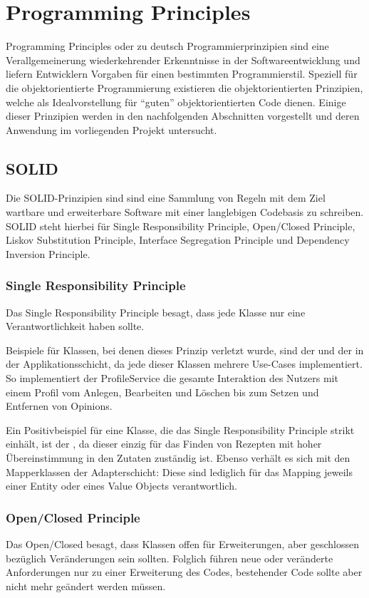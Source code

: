 \chapter{Programming Principles}
Programming Principles oder zu deutsch Programmierprinzipien sind eine Verallgemeinerung wiederkehrender Erkenntnisse in der Softwareentwicklung und liefern Entwicklern Vorgaben für einen bestimmten Programmierstil. Speziell für die objektorientierte Programmierung existieren die objektorientierten Prinzipien, welche als Idealvorstellung für \enquote{guten} objektorientierten Code dienen. Einige dieser Prinzipien werden in den nachfolgenden Abschnitten vorgestellt und deren Anwendung im vorliegenden Projekt untersucht.

\section{SOLID}
Die SOLID-Prinzipien sind sind eine Sammlung von Regeln mit dem Ziel wartbare und erweiterbare Software mit einer langlebigen Codebasis zu schreiben. SOLID steht hierbei für Single Responsibility Principle, Open/Closed Principle, Liskov Substitution Principle, Interface Segregation Principle und Dependency Inversion Principle.

\subsection{Single Responsibility Principle}
Das Single Responsibility Principle besagt, dass jede Klasse nur eine Verantwortlichkeit haben sollte. 

Beispiele für Klassen, bei denen dieses Prinzip verletzt wurde, sind der  und der  in der Applikationsschicht, da jede dieser Klassen mehrere Use-Cases implementiert. So implementiert der ProfileService die gesamte Interaktion des Nutzers mit einem Profil vom Anlegen, Bearbeiten und Löschen bis zum Setzen und Entfernen von Opinions.

Ein Positivbeispiel für eine Klasse, die das Single Responsibility Principle strikt einhält, ist der , da dieser einzig für das Finden von Rezepten mit hoher Übereinstimmung in den Zutaten zuständig ist. Ebenso verhält es sich mit den Mapperklassen der Adapterschicht: Diese sind lediglich für das Mapping jeweils einer Entity oder eines Value Objects verantwortlich.

\subsection{Open/Closed Principle}
Das Open/Closed besagt, dass Klassen offen für Erweiterungen, aber geschlossen bezüglich Veränderungen sein sollten. Folglich führen neue oder veränderte Anforderungen nur zu einer Erweiterung des Codes, bestehender Code sollte aber nicht mehr geändert werden müssen.


